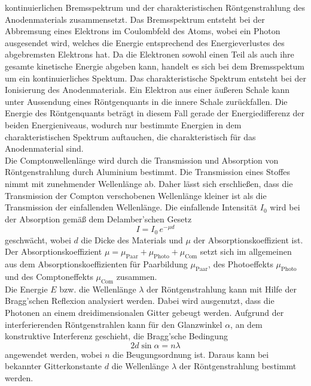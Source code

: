 kontinuierlichen Bremsspektrum und der charakteristischen Röntgenstrahlung des Anodenmaterials zusammensetzt. Das Bremsspektrum entsteht bei der Abbremsung eines Elektrons im Coulombfeld des Atoms, wobei ein 
Photon ausgesendet wird, welches die Energie entsprechend des Energieverlustes des abgebremsten Elektrons hat. Da die Elektronen sowohl einen Teil als auch ihre gesamte kinetische Energie abgeben kann, handelt es sich bei dem Bremsspektum um ein kontinuierliches Spektum.
Das charakteristische Spektrum entsteht bei der Ionisierung des Anodenmaterials. Ein Elektron aus einer äußeren Schale kann unter Aussendung eines Röntgenquants in die innere Schale zurückfallen. Die Energie des Röntgenquants beträgt in diesem Fall gerade der Energiedifferenz der beiden Energieniveaus, wodurch nur bestimmte Energien
in dem charakteristischen Spektrum auftauchen, die charakteristisch für das Anodenmaterial sind.
\\
Die Comptonwellenlänge wird durch die Transmission und Absorption von Röntgenstrahlung durch Aluminium bestimmt. Die Transmission eines Stoffes nimmt mit zunehmender Wellenlänge ab.
Daher lässt sich erschließen, dass die Transmission der Compton verschobenen Wellenlänge kleiner ist als die Transmission der einfallenden Wellenlänge. Die
einfallende Intensität $I_0$ wird bei der Absorption gemäß dem Delamber'schen Gesetz
\begin{equation}
    I=I_0 \, e^{-\mu d}
    \label{eqn:delam}
\end{equation}
geschwächt, wobei $d$ die Dicke des Materials und $\mu$ der Absorptionskoeffizient ist. Der Absorptionskoeffizient $\mu=\mu_\text{Paar}+\mu_\text{Photo}+\mu_\text{Com}$ setzt sich im allgemeinen
aus dem Absorptionskoeffizienten für Paarbildung $\mu_\text{Paar}$, des Photoeffekts $\mu_\text{Photo}$ und des Comptoneffekts $\mu_\text{Com}$ zusammen.
\\
Die Energie $E$ bzw. die Wellenlänge $\lambda$ der Röntgenstrahlung kann mit Hilfe der Bragg'schen Reflexion analysiert werden. Dabei wird ausgenutzt, dass die Photonen an einem dreidimensionalen Gitter gebeugt werden.
Aufgrund der interferierenden Röntgenstrahlen kann für den Glanzwinkel $\alpha$, an dem konstruktive Interferenz geschieht, die Bragg'sche Bedingung
\begin{equation}
    2 d \sin \alpha = n \lambda
    \label{eqn:bragg}
\end{equation}
angewendet werden, wobei $n$ die Beugungsordnung ist. Daraus kann bei bekannter Gitterkonstante $d$ die Wellenlänge $\lambda$ der Röntgenstrahlung bestimmt werden. 